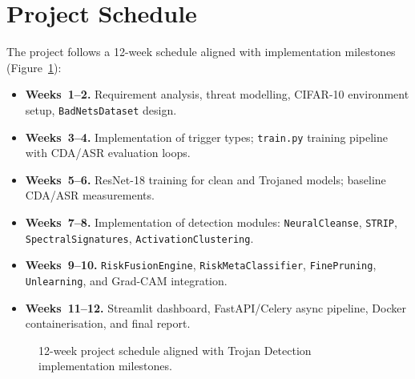 \documentclass[12pt, letterpaper]{article}
\begin{document}
\FloatBarrier



\section{Project Schedule}
\label{sec:schedule}

The project follows a 12-week schedule aligned with implementation milestones
(Figure~\ref{fig:schedule}):

\begin{itemize}
  \item \textbf{Weeks~1--2.}  Requirement analysis, threat modelling,
        CIFAR-10 environment setup, \texttt{BadNetsDataset} design.
  \item \textbf{Weeks~3--4.}  Implementation of trigger types; \texttt{train.py}
        training pipeline with CDA/ASR evaluation loops.
  \item \textbf{Weeks~5--6.}  ResNet-18 training for clean and Trojaned models;
        baseline CDA/ASR measurements.
  \item \textbf{Weeks~7--8.}  Implementation of detection modules:
        \texttt{NeuralCleanse}, \texttt{STRIP}, \texttt{SpectralSignatures},
        \texttt{ActivationClustering}.
  \item \textbf{Weeks~9--10.}  \texttt{RiskFusionEngine},
        \texttt{RiskMetaClassifier}, \texttt{FinePruning},
        \texttt{Unlearning}, and Grad-CAM integration.
  \item \textbf{Weeks~11--12.}  Streamlit dashboard, FastAPI/Celery async
        pipeline, Docker containerisation, and final report.
\end{itemize}

\begin{figure}[!htbp]
  \centering
  \caption{12-week project schedule aligned with Trojan Detection
    implementation milestones.}
  \label{fig:schedule}
\end{figure}
\end{document}
